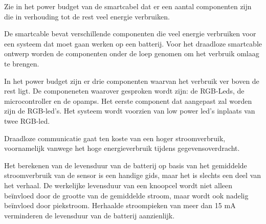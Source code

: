 Zie in het power budget van de smartcabel dat er een aantal componenten zijn die in verhouding tot de rest veel energie verbruiken. 


De smartcable bevat verschillende componenten die veel energie verbruiken voor een systeem dat moet gaan werken op een batterij. Voor het draadloze smartcable ontwerp worden de componenten onder de loep genomen om het verbruik omlaag te brengen. 

In het power budget zijn er drie componenten waarvan het verbruik ver boven de rest ligt. De componeneten waarover gesproken wordt zijn: de RGB-Leds, de microcontroller en de opamps. Het eerste component dat aangepast zal worden zijn de RGB-led's. Het systeem wordt voorzien van low power led's inplaats van twee RGB-led. 


\begin{table}[H]
	\centering
	\caption{Power budget van de bioreactor module}
	\label{tab:power_budget_wisb}
\end{table}



Draadloze communicatie gaat ten koste van een hoger stroomverbruik, voornamelijk vanwege het hoge energieverbruik tijdens gegevensoverdracht. 

Het berekenen van de levensduur van de batterij op basis van het gemiddelde stroomverbruik van de sensor is een handige gids, maar het is slechts een deel van het verhaal. De werkelijke levensduur van een knoopcel wordt niet alleen beïnvloed door de grootte van de gemiddelde stroom, maar wordt ook nadelig beïnvloed door piekstroom. Herhaalde stroompieken van meer dan 15 mA verminderen de levensduur van de batterij aanzienlijk.


 